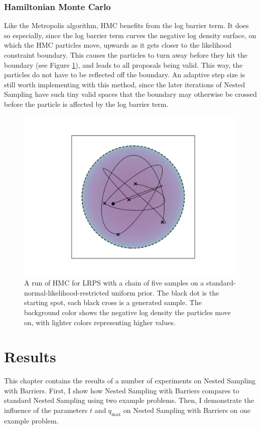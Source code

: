\documentclass[12pt, a4paper]{report}
\begin{document}
\subsection{Hamiltonian Monte Carlo}
Like the Metropolis algorithm, HMC benefits from the log barrier term.
It does so especially, since the log barrier term curves the negative log density surface, on which the HMC particles move, upwards as it gets closer to the likelihood constraint boundary.
This causes the particles to turn away before they hit the boundary (see Figure \ref{fig:barrier_sampling_hmc}), and leads to all proposals being valid.
This way, the particles do not have to be reflected off the boundary.
An adaptive step size is still worth implementing with this method, since the later iterations of Nested Sampling have such tiny valid spaces that the boundary may otherwise be crossed before the particle is affected by the log barrier term.

\begin{figure}
    \centering
    \includegraphics[scale=0.8]{figs/barrier_sampling_hmc.png}
    \caption{A run of HMC for LRPS with a chain of five samples on a standard-normal-likelihood-restricted uniform prior.
    The black dot is the starting spot, each black cross is a generated sample.
    The background color shows the negative log density the particles move on, with lighter colors representing higher values.}
    \label{fig:barrier_sampling_hmc}
\end{figure}



\FloatBarrier
\chapter{Results}
This chapter contains the results of a number of experiments on Nested Sampling with Barriers.
First, I show how Nested Sampling with Barriers compares to standard Nested Sampling using two example problems.
Then, I demonstrate the influence of the parameters $t$ and $q_{\textrm{max}}$ on Nested Sampling with Barriers on one example problem.
\end{document}
